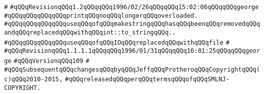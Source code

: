 \verb|#|\newline
\verb|#qQQqRevisionqQQq1.2qQQqqQQq1996/02/26qQQqqQQq15:02:06qQQqqQQqgeorge|\newline
\verb|#qQQqqQQqqQQqqQQqprintqQQqnoqQQqlongerqQQqoverloaded.|\newline
\verb|#qQQqqQQqqQQqqQQquseqQQqofqQQqmakestringqQQqhasqQQqbeenqQQqremovedqQQqandqQQqreplacedqQQqwithqQQqint::to_stringqQQq..|\newline
\verb|#qQQqqQQqqQQqqQQquseqQQqofqQQqIOqQQqreplacedqQQqwithqQQqfile|\newline
\verb|#|\newline
\verb|#qQQqRevisionqQQq1.1.1.1qQQqqQQq1996/01/31qQQqqQQq16:01:25qQQqqQQqgeorge|\newline
\verb|#qQQqVersionqQQq109|\newline
\verb|#|\newline
\verb|#qQQqSubsequentqQQqchangesqQQqbyqQQqJeffqQQqProtheroqQQqCopyrightqQQq(c)qQQq2010-2015,|\newline
\verb|#qQQqreleasedqQQqperqQQqtermsqQQqofqQQqSMLNJ-COPYRIGHT.|\newline

